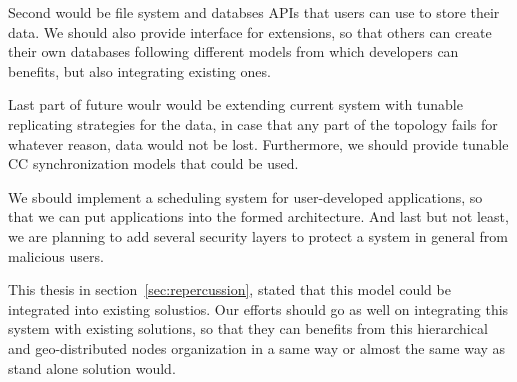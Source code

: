 Second would be file system and databses APIs that users can use to store their data. We should also provide interface for extensions, so that others can create their own databases following different models from which developers can benefits, but also integrating existing ones.

Last part of future woulr would be extending current system with tunable replicating strategies for the data, in case that any part of the topology fails for whatever reason, data would not be lost. Furthermore, we should provide tunable CC synchronization models that could be used.

We sbould implement a scheduling system for user-developed applications, so that we can put applications into the formed architecture. And last but not least, we are planning to add several security layers to protect a system in general from malicious users.

This thesis in section~\ref{sec:repercussion}, stated that this model could be integrated into existing solustios. Our efforts should go as well on integrating this system with existing solutions, so that they can benefits from this hierarchical and geo-distributed nodes organization in a same way or almost the same way as stand alone solution would.
%
%